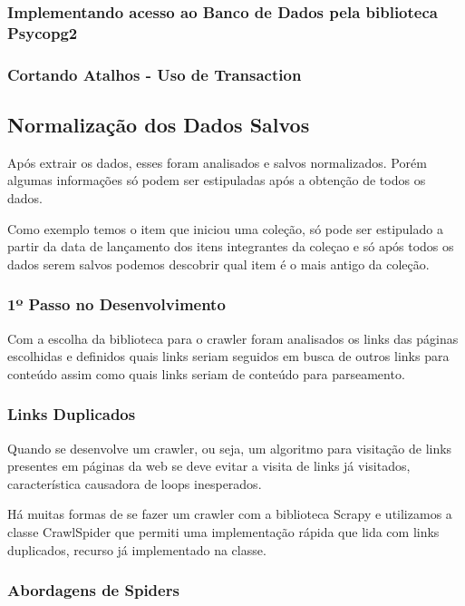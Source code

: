 \documentclass[12pt]{article}
\begin{document}
\subsubsection{Implementando acesso ao Banco de Dados pela biblioteca Psycopg2}


\subsubsection{Cortando Atalhos - Uso de Transaction}


\subsection{Normalização dos Dados Salvos}

Após extrair os dados, esses foram analisados e salvos normalizados. Porém algumas informações só podem ser estipuladas após a obtenção de todos os dados.

Como exemplo temos o item que iniciou uma coleção, só pode ser estipulado a partir da data de lançamento dos itens integrantes da coleçao e só após todos os dados serem salvos podemos descobrir qual item é o mais antigo da coleção.




\subsubsection{1º Passo no Desenvolvimento}

Com a escolha da biblioteca para o crawler foram analisados os links das páginas escolhidas e definidos quais links seriam seguidos em busca de outros links para conteúdo assim como quais links seriam de conteúdo para parseamento. 



\subsubsection{Links Duplicados}

Quando se desenvolve um crawler, ou seja, um algoritmo para visitação de links presentes em páginas da web se deve evitar a visita de links já visitados, característica causadora de loops inesperados. 

Há muitas formas de se fazer um crawler com a biblioteca Scrapy e utilizamos a classe CrawlSpider que permiti uma implementação rápida que lida com links duplicados, recurso já implementado na classe.


\subsubsection {Abordagens de Spiders}
\end{document}
